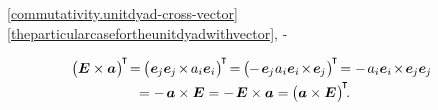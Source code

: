 ~\eqref{commutativity.unitdyad-cross-vector}
~\eqref{theparticularcasefortheunitdyadwithvector},
\crossproductinquotes\hbox{-}
~

\nopagebreak\vspace{-0.5em}
\begin{multline}\label{skewsymmetryofunitdiadcrossvector}
\bigl( \UnitDyad \times \bm{a} \hspace{.1ex} \bigr)^{\hspace{-0.25ex}\T} \hspace{-0.4ex}
= \hspace{-0.2ex} \bigl( \hspace{.1ex} %
    \bm{e}_{\hspace{-0.1ex}j} \bm{e}_{\hspace{-0.1ex}j} \hspace{-0.25ex} \times \hspace{-0.2ex} a_i \bm{e}_i
\hspace{.1ex} \bigr)^{\hspace{-0.25ex}\T} \hspace{-0.33ex}
= \hspace{-0.2ex} \bigl( \hspace{-0.1ex} %
    - \hspace{.25ex} \bm{e}_{\hspace{-0.1ex}j} \hspace{.1ex} a_i \bm{e}_i \hspace{-0.3ex} \times \hspace{-0.3ex} \bm{e}_{\hspace{-0.1ex}j}
\hspace{.1ex} \bigr)^{\hspace{-0.25ex}\T} \hspace{-0.33ex}
= %
    - \hspace{.25ex} a_i \bm{e}_i \hspace{-0.3ex} \times \hspace{-0.3ex} \bm{e}_{\hspace{-0.1ex}j} \bm{e}_{\hspace{-0.1ex}j}
\\[-0.1em]
= - \hspace{.3ex}
\bm{a} \times \UnitDyad
= - \hspace{.25ex} \UnitDyad \times \bm{a}
= \hspace{-0.1ex} \bigl( \bm{a} \times \UnitDyad \hspace{.1ex} \bigr)^{\hspace{-0.25ex}\T}
\hspace{-0.4ex} .
\hspace{1em}
\end{multline}

